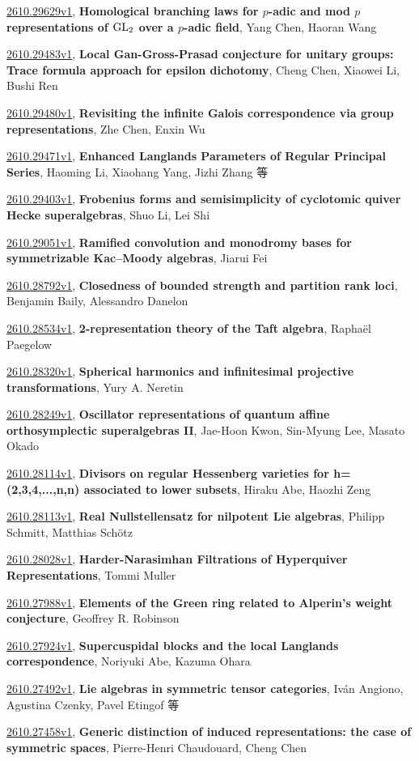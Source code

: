 \documentclass[9pt, a4paper]{article}
\theoremstyle{plain}
\theoremstyle{definition}
\theoremstyle{remark}
\newcommand{\arxiv}[3]{\href{https://arxiv.org/abs/#1}{#1}, \textbf{\textcolor{arxivblue}{#2}}, #3}
\begin{document}
\arxiv{2610.29629v1}{Homological branching laws for $p$-adic and mod $p$ representations of ${\rm GL}_2$ over a $p$-adic field}{Yang Chen, Haoran Wang}

\arxiv{2610.29483v1}{Local Gan-Gross-Prasad conjecture for unitary groups: Trace formula approach for epsilon dichotomy}{Cheng Chen, Xiaowei Li, Bushi Ren}

\arxiv{2610.29480v1}{Revisiting the infinite Galois correspondence via group representations}{Zhe Chen, Enxin Wu}

\arxiv{2610.29471v1}{Enhanced Langlands Parameters of Regular Principal Series}{Haoming Li, Xiaohang Yang, Jizhi Zhang 等}

\arxiv{2610.29403v1}{Frobenius forms and semisimplicity of cyclotomic quiver Hecke superalgebras}{Shuo Li, Lei Shi}

\arxiv{2610.29051v1}{Ramified convolution and monodromy bases for symmetrizable Kac--Moody algebras}{Jiarui Fei}

\arxiv{2610.28792v1}{Closedness of bounded strength and partition rank loci}{Benjamin Baily, Alessandro Danelon}

\arxiv{2610.28534v1}{2-representation theory of the Taft algebra}{Raphaël Paegelow}

\arxiv{2610.28320v1}{Spherical harmonics and infinitesimal projective transformations}{Yury A. Neretin}

\arxiv{2610.28249v1}{Oscillator representations of quantum affine orthosymplectic superalgebras II}{Jae-Hoon Kwon, Sin-Myung Lee, Masato Okado}

\arxiv{2610.28114v1}{Divisors on regular Hessenberg varieties for h=(2,3,4,...,n,n) associated to lower subsets}{Hiraku Abe, Haozhi Zeng}

\arxiv{2610.28113v1}{Real Nullstellensatz for nilpotent Lie algebras}{Philipp Schmitt, Matthias Schötz}

\arxiv{2610.28028v1}{Harder-Narasimhan Filtrations of Hyperquiver Representations}{Tommi Muller}

\arxiv{2610.27988v1}{Elements of the Green ring related to Alperin's weight conjecture}{Geoffrey R. Robinson}

\arxiv{2610.27924v1}{Supercuspidal blocks and the local Langlands correspondence}{Noriyuki Abe, Kazuma Ohara}

\arxiv{2610.27492v1}{Lie algebras in symmetric tensor categories}{Iván Angiono, Agustina Czenky, Pavel Etingof 等}

\arxiv{2610.27458v1}{Generic distinction of induced representations: the case of symmetric spaces}{Pierre-Henri Chaudouard, Cheng Chen}
\end{document}
